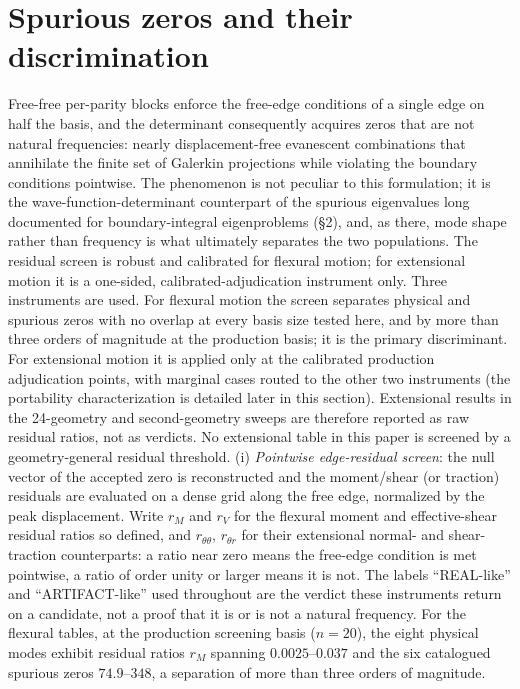 \documentclass[11pt]{article}
\begin{document}
\section{Spurious zeros and their discrimination}
Free-free per-parity blocks enforce the free-edge conditions of a single
edge on half the basis, and the determinant consequently acquires zeros
that are not natural frequencies: nearly displacement-free evanescent
combinations that annihilate the finite set of Galerkin projections while
violating the boundary conditions pointwise. The phenomenon is not peculiar
to this formulation; it is the wave-function-determinant counterpart of the
spurious eigenvalues long documented for boundary-integral eigenproblems
(\S2), and, as there, mode shape rather than frequency is what ultimately
separates the two populations. The residual screen is robust and calibrated for flexural motion; for
extensional motion it is a one-sided, calibrated-adjudication instrument
only. Three instruments are used. For flexural motion the screen
separates physical and spurious zeros with no overlap at every basis
size tested here, and by more than three orders of magnitude at the
production basis; it is the primary discriminant. For extensional motion it is applied only at the
calibrated production adjudication points, with marginal cases routed to
the other two instruments (the portability characterization is detailed
later in this section). Extensional results in the 24-geometry and
second-geometry sweeps are therefore reported as raw residual ratios,
not as verdicts. No extensional table in this paper is screened by a
geometry-general residual threshold.
(i) \emph{Pointwise edge-residual screen}: the null vector of the accepted
zero is reconstructed and the moment/shear (or traction) residuals are
evaluated on a dense grid along the free edge, normalized by the peak
displacement. Write $r_M$ and $r_V$ for the flexural moment and
effective-shear residual ratios so defined, and $r_{\theta\theta}$,
$r_{\theta r}$ for their extensional normal- and shear-traction
counterparts: a ratio near zero means the free-edge condition is met
pointwise, a ratio of order unity or larger means it is not. The labels
``REAL-like'' and ``ARTIFACT-like'' used throughout are the verdict these
instruments return on a candidate, not a proof that it is or is not a
natural frequency. For the flexural tables, at the production screening basis
($n{=}20$), the eight physical modes exhibit residual ratios $r_M$ spanning
$0.0025$--$0.037$ and the six catalogued spurious zeros $74.9$--$348$, a
separation of more than three orders of magnitude.
\end{document}
